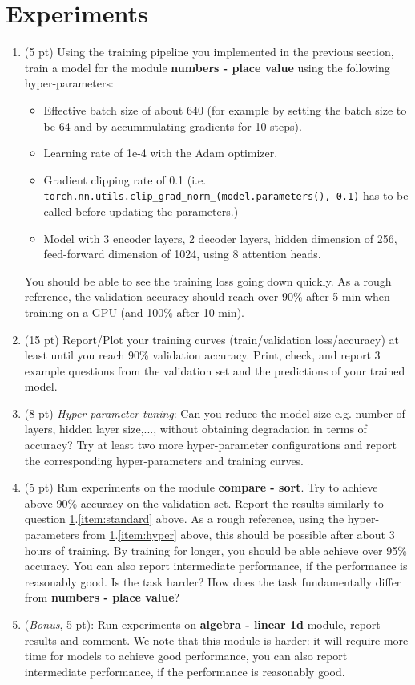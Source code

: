 \documentclass[a4paper,11pt]{article}
\begin{document}
\section{Experiments}
\label{sec:exp}
\begin{enumerate}
\item (5 pt) \label{item:hyper} Using the training pipeline you implemented in the previous section, train a model for
the module \textbf{numbers - place value} using the following hyper-parameters:
\begin{itemize}
\item Effective batch size of about 640 (for example by setting the batch size to be 64 and by accummulating gradients for 10 steps).
\item Learning rate of 1e-4 with the Adam optimizer.
\item Gradient clipping rate of 0.1 (i.e. \texttt{torch.nn.utils.clip\_grad\_norm\_(model.parameters(), 0.1)} has to be called before updating the parameters.)
\item Model with 3 encoder layers, 2 decoder layers, hidden dimension of 256, feed-forward dimension of 1024, using 8 attention heads.
\end{itemize}
You should be able to see the training loss going down quickly.
As a rough reference, the validation accuracy should reach over 90\% after 5 min when training on a GPU
(and 100\% after 10 min).
\item (15 pt) \label{item:standard} Report/Plot your training curves (train/validation loss/accuracy) at least until you reach 90\% validation accuracy.
Print, check, and report 3 example questions from the validation set and the predictions of your trained model.
\item (8 pt) \textit{Hyper-parameter tuning}: Can you reduce the model size e.g. number of layers, hidden layer size,..., without obtaining degradation
in terms of accuracy? Try at least two more hyper-parameter configurations and
report the corresponding hyper-parameters and training curves.
\item (5 pt) Run experiments on the module \textbf{compare - sort}.
Try to achieve above 90\% accuracy on the validation set.
Report the results similarly to question \ref{sec:exp}.\ref{item:standard} above.
As a rough reference, using the hyper-parameters from \ref{sec:exp}.\ref{item:hyper} above, this should be possible after about 3 hours of training.
By training for longer, you should be able achieve over 95\% accuracy.
You can also report intermediate performance, if the performance is reasonably good.
Is the task harder? How does the task fundamentally differ from \textbf{numbers - place value}?
\item (\textit{Bonus}, 5 pt): Run experiments on \textbf{algebra - linear 1d} module, report results and comment.
We note that this module is harder: it will require more time for models to achieve good performance,
you can also report intermediate performance, if the performance is reasonably good.
\end{enumerate}
\end{document}
